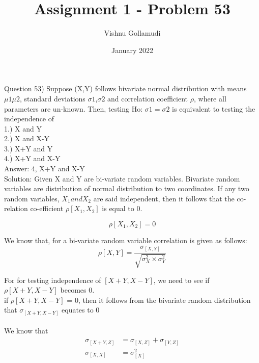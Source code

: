 \documentclass{article}
\title{Assignment 1 - Problem 53}
\author{Vishnu Gollamudi}
\date{January 2022}
\begin{document}
\maketitle

Question 53) Suppose (X,Y) follows bivariate normal distribution with means $\mu1  \mu2$, standard deviations $\sigma1$,$\sigma2$ and correlation coefficient $\rho$, where all parameters are un-known. Then, testing Ho: $\sigma1=\sigma2$ is equivalent to testing the independence of  
\\
1.) X and Y \\
2.) X and X-Y \\
3.) X+Y and Y \\
4.) X+Y and X-Y \\

Answer: 4, X+Y and X-Y \\
Solution:
Given X and Y are bi-variate random variables.  Bivariate random variables are distribution of normal distribution to two coordinates. If any two random variables, $ X_1 and X_2$ are said independent, then it follows that the co-relation co-efficient $\rho[X_1,X_2]$ is equal to 0. \smallskip

\begin{equation*}
\rho[X_1,X_2]  = 0
\end{equation*}

We know that, for a bi-variate random variable correlation is given as follows:
\begin{equation*}
    \rho[X,Y] = \frac{\sigma_{[X,Y]} } {\sqrt{\sigma_X^2 \times \sigma_Y^2}}
\end{equation*}


For for testing independence of $[X+Y, X-Y]$, we need to see if  $\rho[X+Y,X-Y]$ becomes 0.\\
if  $\rho[X+Y,X-Y]$  = 0, then it follows from the bivariate random distribution that $\sigma_{[X+Y,X-Y]}$ equates to 0\\
\\
We know that
\\
\begin{align}
  \sigma_{[X+Y,Z]} &= \sigma_{[X,Z]} + \sigma_{[Y,Z]} \\
  \sigma_{[X,X]} &= \sigma_{[X]}^2 
\end{align}
\end{document}
